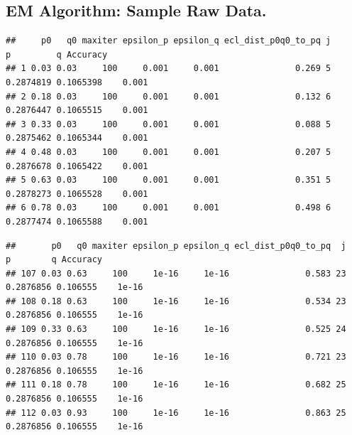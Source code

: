 \documentclass[]{article}
\begin{document}
\subsection{EM Algorithm: Sample Raw
Data.}\label{em-algorithm-sample-raw-data.}

\begin{verbatim}
##     p0   q0 maxiter epsilon_p epsilon_q ecl_dist_p0q0_to_pq j         p         q Accuracy
## 1 0.03 0.03     100     0.001     0.001               0.269 5 0.2874819 0.1065398    0.001
## 2 0.18 0.03     100     0.001     0.001               0.132 6 0.2876447 0.1065515    0.001
## 3 0.33 0.03     100     0.001     0.001               0.088 5 0.2875462 0.1065344    0.001
## 4 0.48 0.03     100     0.001     0.001               0.207 5 0.2876678 0.1065422    0.001
## 5 0.63 0.03     100     0.001     0.001               0.351 5 0.2878273 0.1065528    0.001
## 6 0.78 0.03     100     0.001     0.001               0.498 6 0.2877474 0.1065588    0.001
\end{verbatim}

\begin{verbatim}
##       p0   q0 maxiter epsilon_p epsilon_q ecl_dist_p0q0_to_pq  j         p        q Accuracy
## 107 0.03 0.63     100     1e-16     1e-16               0.583 23 0.2876856 0.106555    1e-16
## 108 0.18 0.63     100     1e-16     1e-16               0.534 23 0.2876856 0.106555    1e-16
## 109 0.33 0.63     100     1e-16     1e-16               0.525 24 0.2876856 0.106555    1e-16
## 110 0.03 0.78     100     1e-16     1e-16               0.721 23 0.2876856 0.106555    1e-16
## 111 0.18 0.78     100     1e-16     1e-16               0.682 25 0.2876856 0.106555    1e-16
## 112 0.03 0.93     100     1e-16     1e-16               0.863 25 0.2876856 0.106555    1e-16
\end{verbatim}
\end{document}
